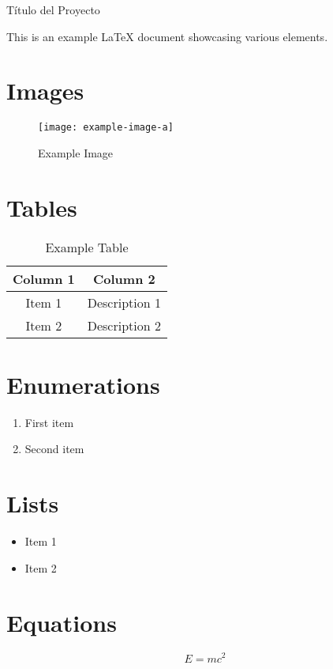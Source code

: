 \documentclass[10pt, a4paper]{article} %
\newcommand{\theTitle}{Título del Proyecto}
\begin{document}

\clearpage
\vspace*{6pt}
\centerline{\huge \theTitle}
\vspace*{8pt}

This is an example LaTeX document showcasing various elements.

\section{Images}
\begin{figure}[h]
	\centering
	\texttt{[image: example-image-a]}
	\caption{Example Image}
	\label{fig:example}
\end{figure}

\section{Tables}
\begin{table}[h]
	\centering
	\begin{tabular}{|c|c|}
		\hline
		Column 1 & Column 2 \\
		\hline
		Item 1 & Description 1 \\
		Item 2 & Description 2 \\
		\hline
	\end{tabular}
	\caption{Example Table}
	\label{tab:example}
\end{table}

\section{Enumerations}
\begin{enumerate}
	\item First item
	\item Second item
\end{enumerate}

\section{Lists}
\begin{itemize}
	\item Item 1
	\item Item 2
\end{itemize}

\section{Equations}
\begin{equation}
	\label{eq:example}
	E = mc^2
\end{equation}


\nocite{*} %

\clearpage




\iffalse
\begin{thebibliography}{9}
	\bibitem{Ejemplo1} Autor1, A. (2022). Título del libro. Editorial.
\end{thebibliography}
\fi
\end{document}
